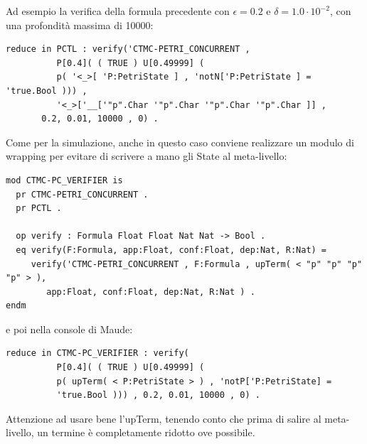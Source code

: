 Ad esempio la verifica della formula precedente con $\epsilon = 0.2$
e $\delta = 1.0\cdot10^{-2}$, con una profondità massima di 10000:

\begin{Verbatim}[fontsize=\small]
reduce in PCTL : verify('CTMC-PETRI_CONCURRENT , 
          P[0.4]( ( TRUE ) U[0.49999] (
          p( '<_>[ 'P:PetriState ] , 'notN['P:PetriState ] = 'true.Bool ))) ,
          '<_>['__['"p".Char '"p".Char '"p".Char '"p".Char ]] ,
       0.2, 0.01, 10000 , 0) .
\end{Verbatim}

Come per la simulazione, anche in questo caso conviene realizzare un modulo di
wrapping per evitare di scrivere a mano gli State al meta-livello:
\begin{Verbatim}[fontsize=\small]
mod CTMC-PC_VERIFIER is
  pr CTMC-PETRI_CONCURRENT .
  pr PCTL .
  
  op verify : Formula Float Float Nat Nat -> Bool .
  eq verify(F:Formula, app:Float, conf:Float, dep:Nat, R:Nat) =
     verify('CTMC-PETRI_CONCURRENT , F:Formula , upTerm( < "p" "p" "p" "p" > ),    		  
        app:Float, conf:Float, dep:Nat, R:Nat ) .  
endm
\end{Verbatim}
e poi nella console di Maude:
\begin{Verbatim}[fontsize=\small]
reduce in CTMC-PC_VERIFIER : verify(
          P[0.4]( ( TRUE ) U[0.49999] (
          p( upTerm( < P:PetriState > ) , 'notP['P:PetriState] =
          'true.Bool ))) , 0.2, 0.01, 10000 , 0) .
\end{Verbatim}
Attenzione ad usare bene l'upTerm, tenendo conto che prima di salire al
meta-livello, un termine è completamente ridotto ove possibile.
